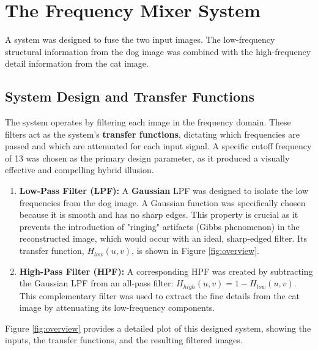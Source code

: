 \documentclass[11pt, a4paper]{article}
\begin{document}
\section{The Frequency Mixer System}
A system was designed to fuse the two input images. The low-frequency structural information from the dog image was combined with the high-frequency detail information from the cat image.

\subsection{System Design and Transfer Functions}
The system operates by filtering each image in the frequency domain. These filters act as the system's \textbf{transfer functions}, dictating which frequencies are passed and which are attenuated for each input signal. A specific cutoff frequency of 13 was chosen as the primary design parameter, as it produced a visually effective and compelling hybrid illusion.

\begin{enumerate}
    \item \textbf{Low-Pass Filter (LPF):} A \textbf{Gaussian} LPF was designed to isolate the low frequencies from the dog image. A Gaussian function was specifically chosen because it is smooth and has no sharp edges. This property is crucial as it prevents the introduction of "ringing" artifacts (Gibbs phenomenon) in the reconstructed image, which would occur with an ideal, sharp-edged filter. Its transfer function, \(H_{low}(u, v)\), is shown in Figure \ref{fig:overview}.
    
    \item \textbf{High-Pass Filter (HPF):} A corresponding HPF was created by subtracting the Gaussian LPF from an all-pass filter: \(H_{high}(u, v) = 1 - H_{low}(u, v)\). This complementary filter was used to extract the fine details from the cat image by attenuating its low-frequency components.
\end{enumerate}

Figure \ref{fig:overview} provides a detailed plot of this designed system, showing the inputs, the transfer functions, and the resulting filtered images.
\end{document}
